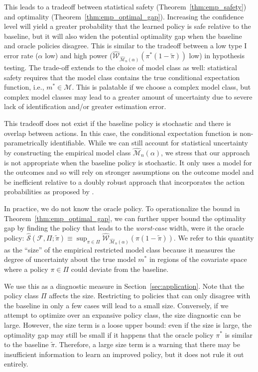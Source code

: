 \documentclass[12pt]{article}
\theoremstyle{definition}
\newcommand{\<}{\langle}
\renewcommand{\>}{\rangle}
\newcommand\mcal[1]{\ensuremath{\mathcal{#1}}}
\begin{document}
This leads to a tradeoff between statistical safety
(Theorem~\ref{thm:emp_safety}) and optimality
(Theorem~\ref{thm:emp_optimal_gap}).  Increasing the confidence
level will yield a greater probability that the learned
policy is safe relative to the baseline, but it will also widen the
potential optimality gap when the baseline and oracle policies
disagree.  This is similar to the tradeoff between a low type I
error rate ($\alpha$ low) and high power
($\widehat{\mcal{W}}_{\widehat{\mcal{M}}_n(\alpha)}\left(\pi^\ast (1
  - \tilde{\pi})\right)$ low) in hypothesis testing.  The trade-off
extends to the choice of model class as well: statistical safety
requires that the model class contains the true conditional
expectation function, i.e., $m^\ast \in \mathcal{M}$.  This is
palatable if we choose a complex model class, but complex model
classes may lead to a greater amount of uncertainty due to severe
lack of identification and/or greater estimation error.

This tradeoff does not exist if the baseline policy is stochastic and
there is overlap between actions. In this case, the conditional
expectation function is non-parametrically identifiable.  While we can
still account for statistical uncertainty by constructing the
empirical model class $\widehat{\mathcal{M}}_n(\alpha)$, we stress
that our approach is not appropriate when the baseline policy is
stochastic. It only uses a model for the outcomes and so will rely on
stronger assumptions on the outcome model and be inefficient relative
to a doubly robust approach that incorporates the action probabilities
as proposed by \citet{Athey2021}.



In practice, we do not know the oracle policy. To operationalize
the bound in Theorem~\ref{thm:emp_optimal_gap}, we can further upper
bound the optimality gap by finding the policy that leads to the
\emph{worst-case} width, were it the oracle policy:
$\widehat{\mathcal{S}}(\mathcal{F}, \Pi; \tilde{\pi}) \equiv
\sup_{\pi \in \Pi}
\widehat{\mcal{W}}_{\widehat{\mcal{M}}_n(\alpha)}\left(\pi (1 -
  \tilde{\pi})\right)$.  We refer to this quantity as the ``size''
of the empirical restricted model class because it measures the
degree of uncertainty about the true model $m^\ast$ in regions of
the covariate space where a policy $\pi \in \Pi$ could deviate from
the baseline.

We use this as a diagnostic measure in
Section~\ref{sec:application}.  Note that the policy class $\Pi$
affects the size.  Restricting to policies that can only disagree
with the baseline in only a few cases will lead to a small
size. Conversely, if we attempt to optimize over an expansive policy
class, the size diagnostic can be large.  However, the size term is
a loose upper bound: even if the size is large, the optimality gap
may still be small if it happens that the oracle policy $\pi^\ast$
is similar to the baseline $\tilde{\pi}$. Therefore, a large size
term is a warning that there may be insufficient information to
learn an improved policy, but it does not rule it out entirely.  
\end{document}
